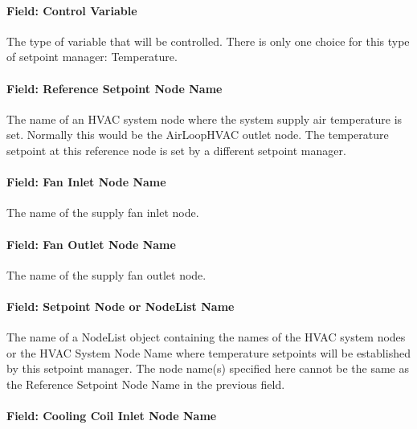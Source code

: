 \paragraph{Field: Control Variable}\label{field-control-variable-8}

The type of variable that will be controlled. There is only one choice for this type of setpoint manager: Temperature.

\paragraph{Field: Reference Setpoint Node Name}\label{field-reference-setpoint-node-name}

The name of an HVAC system node where the system supply air temperature is set. Normally this would be the AirLoopHVAC outlet node. The temperature setpoint at this reference node is set by a different setpoint manager.

\paragraph{Field: Fan Inlet Node Name}\label{field-fan-inlet-node-name}

The name of the supply fan inlet node.

\paragraph{Field: Fan Outlet Node Name}\label{field-fan-outlet-node-name-000}

The name of the supply fan outlet node.

\paragraph{Field: Setpoint Node or NodeList Name}\label{field-setpoint-node-or-nodelist-name-8}

The name of a NodeList object containing the names of the HVAC system nodes or the HVAC System Node Name where temperature setpoints will be established by this setpoint manager. The node name(s) specified here cannot be the same as the Reference Setpoint Node Name in the previous field.

\paragraph{Field: Cooling Coil Inlet Node Name}\label{field-cooling-coil-inlet-node-name}

